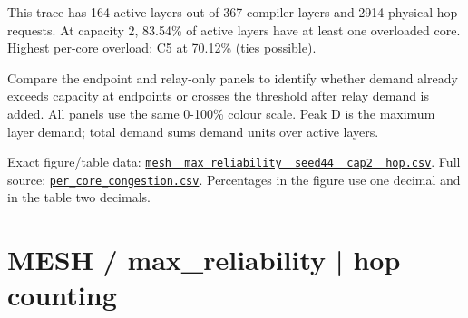\documentclass[10pt,a4paper]{article}
\begin{document}
This trace has 164 active layers out of 367 compiler layers and 2914 physical hop requests. At capacity 2, 83.54\% of active layers have at least one overloaded core. Highest per-core overload: C5 at 70.12\% (ties possible).\par
Compare the endpoint and relay-only panels to identify whether demand already exceeds capacity at endpoints or crosses the threshold after relay demand is added. All panels use the same 0-100\% colour scale. Peak D is the maximum layer demand; total demand sums demand units over active layers.\par
Exact figure/table data: \href{\detokenize{file:///home/dhruv-pansuriya/Documents/BTP/Compiler-Driven-ACE/output/pdf/qaoa_methods_congestion/tables/mesh__max_reliability__seed44__cap2__hop.csv}}{\nolinkurl{mesh__max_reliability__seed44__cap2__hop.csv}}. Full source: \href{\detokenize{file:///home/dhruv-pansuriya/Documents/BTP/Compiler-Driven-ACE/results/qaoa_2seed_2026-10-26/congestion/per_core_congestion.csv}}{\nolinkurl{per_core_congestion.csv}}. Percentages in the figure use one decimal and in the table two decimals.\par
\clearpage
\section*{MESH / max\_reliability | hop counting}
\end{document}
